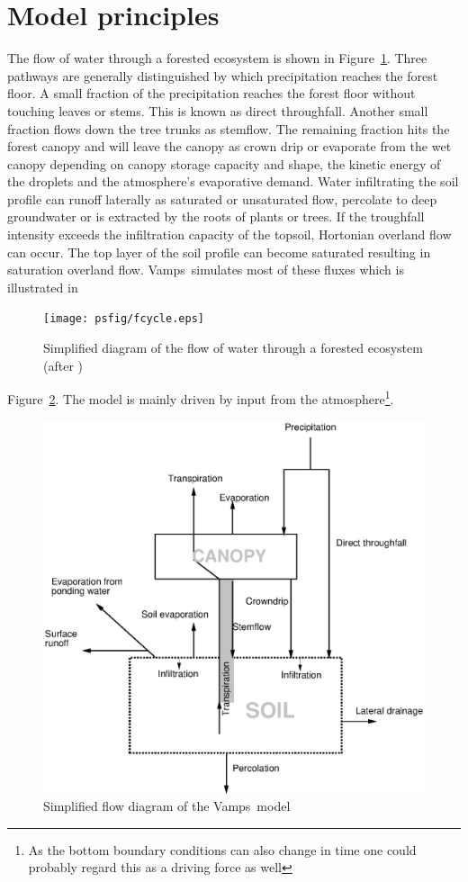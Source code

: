 \documentclass[twocolumn]{article}
\newcommand{\vamps}{{\sf Vamps}}
\begin{document}
\section*{Model principles}
The flow of water through a forested ecosystem is shown in
Figure~\ref{fig:fcycle}. Three pathways are generally 
distinguished by which precipitation reaches the forest floor. A small
fraction of the precipitation reaches the forest floor without touching leaves
or stems. This is known as direct throughfall. Another small 
fraction flows down the tree trunks as stemflow. The remaining fraction
hits the forest canopy and will leave the canopy as
crown drip or evaporate from the wet canopy depending on canopy
storage capacity and shape, the kinetic energy of the droplets and the
atmosphere's evaporative demand.  Water infiltrating the soil
profile can runoff laterally as saturated or unsaturated flow,
percolate to deep groundwater or is extracted by the roots of
plants or trees. If the troughfall intensity exceeds the infiltration
capacity of the topsoil, Hortonian overland flow can occur. The top
layer of the soil profile can become saturated resulting in saturation
overland flow. \vamps\ simulates most of these fluxes which is
illustrated in
\begin{figure}
\centerline{\texttt{[image: psfig/fcycle.eps]}}
\caption{Simplified diagram of the flow of water through a forested
ecosystem (after \protect{})}
\label{fig:fcycle}
\end{figure}
Figure~\ref{fig:vflow}.
The model is mainly driven by input from
the atmosphere\footnote{As the bottom boundary conditions can also
change in time one could probably regard this as a driving force as
well}.
\begin{figure}
\centerline{\includegraphics{psfig/vflow.eps}}
\caption{Simplified flow diagram of the \vamps\ model}
\label{fig:vflow}
\end{figure}
\end{document}

